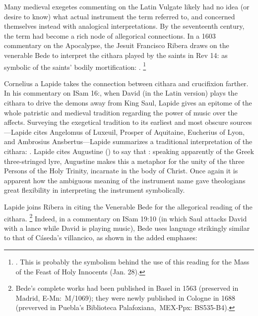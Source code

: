 Many medieval exegetes commenting on the Latin Vulgate likely had no idea (or desire to know) what actual instrument the term  referred to, and concerned themselves instead with analogical interpretations.
By the seventeenth century, the term had become a rich node of allegorical connections.
In a 1603 commentary on the Apocalypse, the Jesuit Francisco Ribera draws on the venerable Bede to interpret the cithara played by the saints in Rev 14: as symbolic of the saints' bodily mortification: 
.%
	\footnote{
	\autocite[429]{Ribera:Apocalypse}.
This is probably the symbolism behind the use of this reading for the Mass of the Feast of Holy Innocents (Jan. 28).
	} 

Cornelius a Lapide takes the connection between cithara and crucifixion farther.
In his commentary on ISam 16:, when David (in the Latin version) plays the cithara to drive the demons away from King Saul, Lapide gives an epitome of the whole patristic and medieval tradition regarding the power of music over the affects.
Surveying the exegetical tradition to its earliest and most obscure sources---Lapide cites Angelomus of Luxeuil, Prosper of Aquitaine, Eucherius of Lyon, and Ambrosius Ansbertus---Lapide summarizes a traditional interpretation of the cithara:
.%
	\Autocite[370]{Lapide:1Samuel}
Lapide cites Augustine () to say that : speaking apparently of the Greek three-stringed lyre, Augustine makes this a metaphor for the unity of the three Persons of the Holy Trinity, incarnate in the body of Christ.%
	\Autocite[370]{Lapide:1Samuel}
Once again it is apparent how the ambiguous meaning of the instrument name gave theologians great flexibility in interpreting the instrument symbolically.

Lapide joins Ribera in citing the Venerable Bede for the allegorical reading of the cithara.%
	\footnote{%
Bede's complete works had been published in Basel in 1563 (preserved in Madrid, E-Mn:~M/1069); they were newly published in Cologne in 1688 (preverved in Puebla's Biblioteca Palafoxiana,~MEX-Ppx: BS535-B4).
	}
Indeed, in a commentary on ISam 19:10 (in which Saul attacks David with a lance while David is playing music), Bede uses language strikingly similar to that of Cáseda's villancico, as shown in the added emphases:

